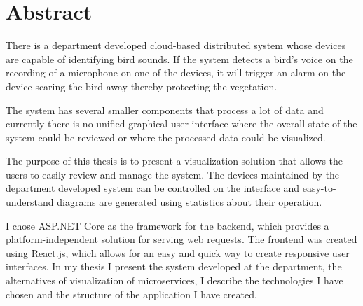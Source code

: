\chapter*{Abstract}

There is a department developed cloud-based distributed system whose devices are capable of identifying bird sounds.
If the system detects a bird's voice on the recording of a microphone on one of the devices, it will trigger
an alarm on the device scaring the bird away thereby protecting the vegetation.

The system has several smaller components that process a lot of data and currently there is no unified graphical user interface where the overall state of the system 
could be reviewed or where the processed data could be visualized.

The purpose of this thesis is to present a visualization solution that allows the users to easily review
and manage the system. The devices maintained by the department developed system can be controlled on the interface
and easy-to-understand diagrams are generated using statistics about their operation.

I chose ASP.NET Core as the framework for the backend, which provides a platform-independent solution for serving web requests.
The frontend was created using React.js, which allows for an easy and quick way to create responsive user interfaces.
In my thesis I present the system developed at the department, the alternatives of visualization of microservices,
I describe the technologies I have chosen and the structure of the application I have created.

\vfill
\selectthesislanguage

\setcounter{romanPage}{\value{page}}
